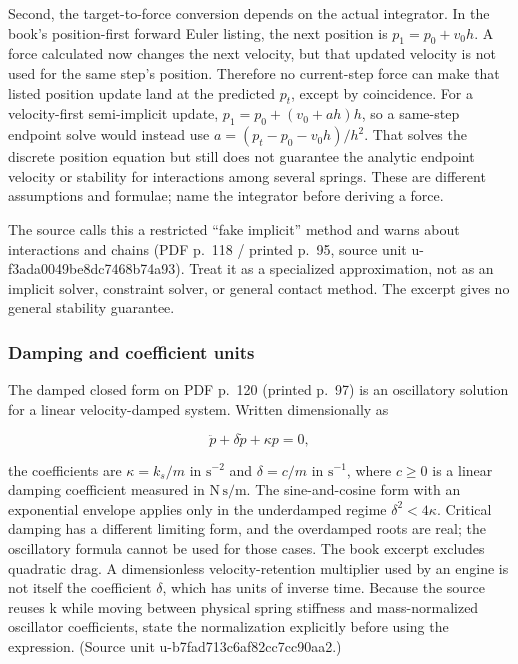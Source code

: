 Second, the target-to-force conversion depends on the actual integrator. In the book's position-first forward Euler listing, the next position is \(p_1=p_0+v_0h\). A force calculated now changes the next velocity, but that updated velocity is not used for the same step's position. Therefore no current-step force can make that listed position update land at the predicted \(p_t\), except by coincidence. For a velocity-first semi-implicit update, \(p_1=p_0+(v_0+ah)h\), so a same-step endpoint solve would instead use \(a=(p_t-p_0-v_0h)/h^2\). That solves the discrete position equation but still does not guarantee the analytic endpoint velocity or stability for interactions among several springs. These are different assumptions and formulae; name the integrator before deriving a force.

The source calls this a restricted ``fake implicit'' method and warns about interactions and chains (PDF p.~118 / printed p.~95, source unit u-f3ada0049be8dc7468b74a93). Treat it as a specialized approximation, not as an implicit solver, constraint solver, or general contact method. The excerpt gives no general stability guarantee.

\subsubsection{Damping and coefficient units}\label{damping-and-coefficient-units}

The damped closed form on PDF p.~120 (printed p.~97) is an oscillatory solution for a linear velocity-damped system. Written dimensionally as

\[
\ddot p+\delta\dot p+\kappa p=0,
\]

the coefficients are \(\kappa=k_s/m\) in \(\mathrm{s^{-2}}\) and \(\delta=c/m\) in \(\mathrm{s^{-1}}\), where \(c\geq0\) is a linear damping coefficient measured in \(\mathrm{N\,s/m}\). The sine-and-cosine form with an exponential envelope applies only in the underdamped regime \(\delta^2<4\kappa\). Critical damping has a different limiting form, and the overdamped roots are real; the oscillatory formula cannot be used for those cases. The book excerpt excludes quadratic drag. A dimensionless velocity-retention multiplier used by an engine is not itself the coefficient \(\delta\), which has units of inverse time. Because the source reuses k while moving between physical spring stiffness and mass-normalized oscillator coefficients, state the normalization explicitly before using the expression. (Source unit u-b7fad713c6af82cc7cc90aa2.)

